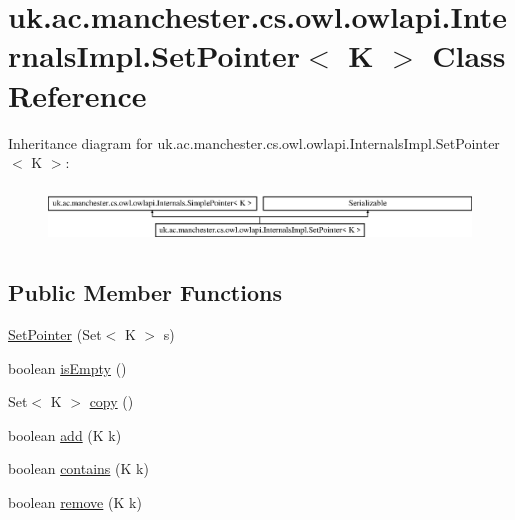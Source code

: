 \hypertarget{classuk_1_1ac_1_1manchester_1_1cs_1_1owl_1_1owlapi_1_1_internals_impl_1_1_set_pointer_3_01_k_01_4}{\section{uk.\-ac.\-manchester.\-cs.\-owl.\-owlapi.\-Internals\-Impl.\-Set\-Pointer$<$ K $>$ Class Reference}
\label{classuk_1_1ac_1_1manchester_1_1cs_1_1owl_1_1owlapi_1_1_internals_impl_1_1_set_pointer_3_01_k_01_4}
}
Inheritance diagram for uk.\-ac.\-manchester.\-cs.\-owl.\-owlapi.\-Internals\-Impl.\-Set\-Pointer$<$ K $>$\-:\begin{figure}[H]
\begin{center}
\leavevmode
\includegraphics[height=1.521739cm]{classuk_1_1ac_1_1manchester_1_1cs_1_1owl_1_1owlapi_1_1_internals_impl_1_1_set_pointer_3_01_k_01_4}
\end{center}
\end{figure}
\subsection*{Public Member Functions}
\begin{DoxyCompactItemize}
\item 
\hyperlink{classuk_1_1ac_1_1manchester_1_1cs_1_1owl_1_1owlapi_1_1_internals_impl_1_1_set_pointer_3_01_k_01_4_a1a29cb9a6ff19be34fc9a1dd348a0723}{Set\-Pointer} (Set$<$ K $>$ s)
\item 
boolean \hyperlink{classuk_1_1ac_1_1manchester_1_1cs_1_1owl_1_1owlapi_1_1_internals_impl_1_1_set_pointer_3_01_k_01_4_a29c4c3a03e4a8660a04cd7b9e9057c7b}{is\-Empty} ()
\item 
Set$<$ K $>$ \hyperlink{classuk_1_1ac_1_1manchester_1_1cs_1_1owl_1_1owlapi_1_1_internals_impl_1_1_set_pointer_3_01_k_01_4_a0d0252377d30089e8819eea0ed63a6dd}{copy} ()
\item 
boolean \hyperlink{classuk_1_1ac_1_1manchester_1_1cs_1_1owl_1_1owlapi_1_1_internals_impl_1_1_set_pointer_3_01_k_01_4_a7f4d8f04d589e7bbefd7018f2f85a98d}{add} (K k)
\item 
boolean \hyperlink{classuk_1_1ac_1_1manchester_1_1cs_1_1owl_1_1owlapi_1_1_internals_impl_1_1_set_pointer_3_01_k_01_4_aba2122a0f20c40a1eee3d5ad4f4a2fb5}{contains} (K k)
\item 
boolean \hyperlink{classuk_1_1ac_1_1manchester_1_1cs_1_1owl_1_1owlapi_1_1_internals_impl_1_1_set_pointer_3_01_k_01_4_ad0440cebeb0fa450ca5135557ca3d271}{remove} (K k)
\end{DoxyCompactItemize}
